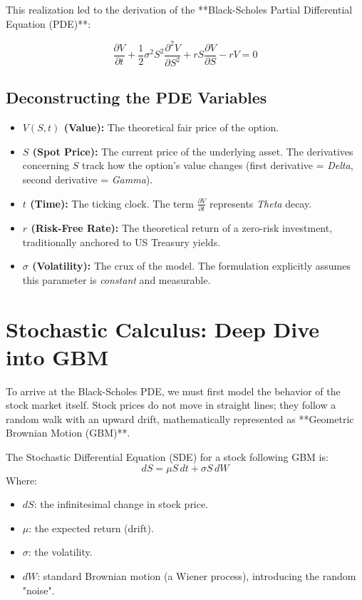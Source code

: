 \documentclass[12pt, a4paper]{article}
\begin{document}
This realization led to the derivation of the **Black-Scholes Partial Differential Equation (PDE)**:

\begin{equation}
\frac{\partial V}{\partial t} + \frac{1}{2}\sigma^2 S^2 \frac{\partial^2 V}{\partial S^2} + rS \frac{\partial V}{\partial S} - rV = 0
\end{equation}

\subsection{Deconstructing the PDE Variables}
\begin{itemize}
    \item \textbf{$V(S, t)$ (Value):} The theoretical fair price of the option.
    \item \textbf{$S$ (Spot Price):} The current price of the underlying asset. The derivatives concerning $S$ track how the option's value changes (first derivative = \textit{Delta}, second derivative = \textit{Gamma}).
    \item \textbf{$t$ (Time):} The ticking clock. The term $\frac{\partial V}{\partial t}$ represents \textit{Theta} decay.
    \item \textbf{$r$ (Risk-Free Rate):} The theoretical return of a zero-risk investment, traditionally anchored to US Treasury yields.
    \item \textbf{$\sigma$ (Volatility):} The crux of the model. The formulation explicitly assumes this parameter is \textit{constant} and measurable.
\end{itemize}

\section{Stochastic Calculus: Deep Dive into GBM}
To arrive at the Black-Scholes PDE, we must first model the behavior of the stock market itself. Stock prices do not move in straight lines; they follow a random walk with an upward drift, mathematically represented as **Geometric Brownian Motion (GBM)**.

The Stochastic Differential Equation (SDE) for a stock following GBM is:
\begin{equation}
dS = \mu S \, dt + \sigma S \, dW
\end{equation}
Where:
\begin{itemize}
    \item $dS$: the infinitesimal change in stock price.
    \item $\mu$: the expected return (drift).
    \item $\sigma$: the volatility.
    \item $dW$: standard Brownian motion (a Wiener process), introducing the random "noise".
\end{itemize}
\end{document}
